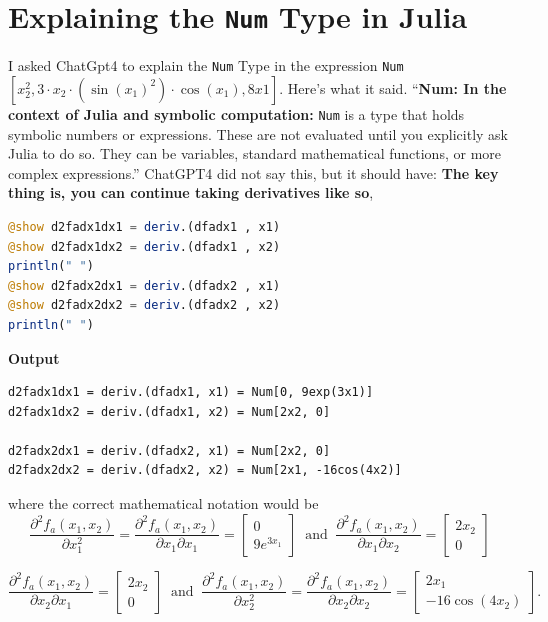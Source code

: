 \section*{Explaining the \texttt{Num} Type in Julia}

I asked ChatGpt4 to explain the \texttt{Num} Type in the expression \texttt{Num}$[x_2^2, 3 \cdot x_2 \cdot (\sin(x_1)^2) \cdot \cos(x_1), 8x1]$. Here's what it said. ``\textbf{Num: In the context of Julia and symbolic computation:} \texttt{Num} is a type that holds symbolic numbers or expressions. These are not evaluated until you explicitly ask Julia to do so. They can be variables, standard mathematical functions, or more complex expressions.'' ChatGPT4 did not say this, but it should have: {\bf The key thing is, you can continue taking derivatives like so},\\

\begin{lstlisting}[language=Julia,style=mystyle]
@show d2fadx1dx1 = deriv.(dfadx1 , x1)
@show d2fadx1dx2 = deriv.(dfadx1 , x2)
println(" ")
@show d2fadx2dx1 = deriv.(dfadx2 , x1)
@show d2fadx2dx2 = deriv.(dfadx2 , x2)
println(" ")
\end{lstlisting}
\textbf{Output} 
\begin{verbatim}
d2fadx1dx1 = deriv.(dfadx1, x1) = Num[0, 9exp(3x1)]
d2fadx1dx2 = deriv.(dfadx1, x2) = Num[2x2, 0]
 
d2fadx2dx1 = deriv.(dfadx2, x1) = Num[2x2, 0]
d2fadx2dx2 = deriv.(dfadx2, x2) = Num[2x1, -16cos(4x2)]
\end{verbatim}
where the correct mathematical notation would be
$$\frac{\partial^2 f_a(x_1, x_2)}{\partial x_1^2} = \frac{\partial^2 f_a(x_1, x_2)}{\partial x_1 \partial x_1} = \left[ \begin{array}{c}
        0\\ 9 e^{3 x_1}
    \end{array}\right] ~\text{ and } ~ \frac{\partial^2 f_a(x_1, x_2)}{\partial x_1 \partial x_2} = \left[ \begin{array}{c}
        2 x_2\\ 0
    \end{array}\right]$$

    $$ \frac{\partial^2 f_a(x_1, x_2)}{\partial x_2 \partial x_1} = \left[ \begin{array}{c}
        2 x_2\\ 0
    \end{array}\right] ~\text{ and } ~ \frac{\partial^2 f_a(x_1, x_2)}{\partial x_2^2} =\frac{\partial^2 f_a(x_1, x_2)}{\partial x_2 \partial x_2} = \left[ \begin{array}{c}
        2 x_1\\ -16 \cos(4 x_2)
    \end{array}\right].$$

